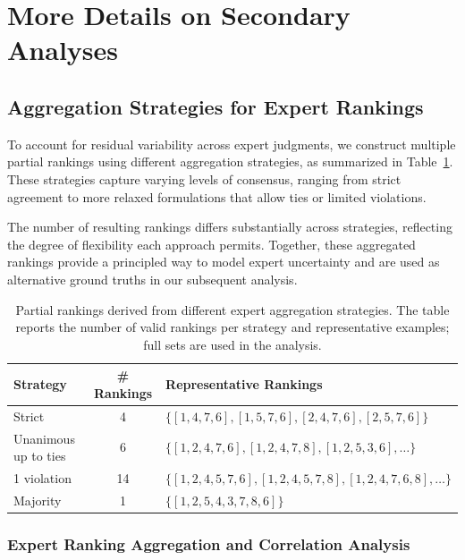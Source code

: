 \section{More Details on Secondary Analyses}
\label{app:secondary-analyses}

\subsection{Aggregation Strategies for Expert Rankings}
\label{app:aggregation_strategies}

To account for residual variability across expert judgments, we construct multiple partial rankings using different aggregation strategies, as summarized in Table~\ref{tab:expert_aggregation}. These strategies capture varying levels of consensus, ranging from strict agreement to more relaxed formulations that allow ties or limited violations.

The number of resulting rankings differs substantially across strategies, reflecting the degree of flexibility each approach permits. Together, these aggregated rankings provide a principled way to model expert uncertainty and are used as alternative ground truths in our subsequent analysis.

\begin{table}[t]
\centering
\scriptsize
\begin{tabular}{lcl}
\toprule
\textbf{Strategy} & \textbf{\# Rankings} & \textbf{Representative Rankings} \\
\midrule
Strict & 4 &
$\{[1,4,7,6], [1,5,7,6], [2,4,7,6], [2,5,7,6]\}$ \\

Unanimous up to ties & 6 &
$\{[1,2,4,7,6], [1,2,4,7,8], [1,2,5,3,6], \dots\}$ \\

1 violation & 14 &
$\{[1,2,4,5,7,6], [1,2,4,5,7,8], [1,2,4,7,6,8], \dots\}$ \\

Majority & 1 &
$\{[1,2,5,4,3,7,8,6]\}$ \\
\bottomrule
\end{tabular}
\caption{Partial rankings derived from different expert aggregation strategies. The table reports the number of valid rankings per strategy and representative examples; full sets are used in the analysis.}
\label{tab:expert_aggregation}
\end{table}

\subsubsection{Expert Ranking Aggregation and Correlation Analysis}

